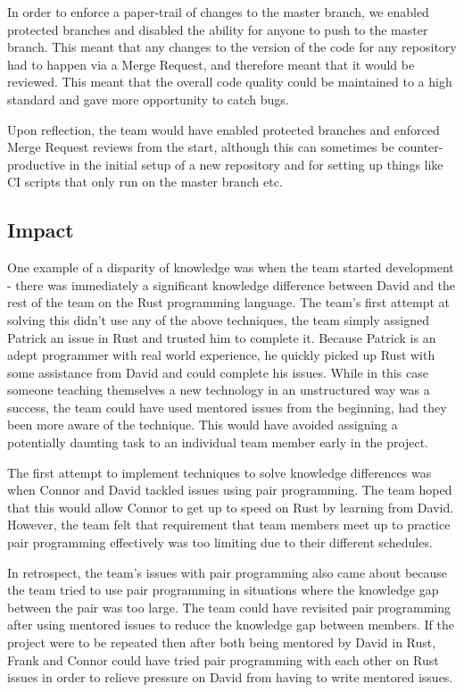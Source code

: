 \documentclass{l3proj}
\begin{document}
In order to enforce a paper-trail of changes to the master branch, we enabled protected branches and disabled the ability for anyone to push to the master branch. This meant that any changes to the  version of the code for any repository had to happen via a Merge Request, and therefore meant that it would be reviewed. This meant that the overall code quality could be maintained to a high standard and gave more opportunity to catch bugs.

Upon reflection, the team would have enabled protected branches and enforced Merge Request reviews from the start, although this can sometimes be counter-productive in the initial setup of a new repository and for setting up things like CI scripts that only run on the master branch etc.

\subsection{Impact}
One example of a disparity of knowledge was when the team started development - there was immediately a significant knowledge difference between David and the rest of the team on the Rust programming language. The team's first attempt at solving this didn't use any of the above techniques, the team simply assigned Patrick an issue in Rust and trusted him to complete it. Because Patrick is an adept programmer with real world experience, he quickly picked up Rust with some assistance from David and could complete his issues. While in this case someone teaching themselves a new technology in an unstructured way was a success, the team could have used mentored issues from the beginning, had they been more aware of the technique. This would have avoided assigning a potentially daunting task to an individual team member early in the project.

The first attempt to implement techniques to solve knowledge differences was when Connor and David tackled issues using pair programming. The team hoped that this would allow Connor to get up to speed on Rust by learning from David. However, the team felt that requirement that team members meet up to practice pair programming effectively was too limiting due to their different schedules.

In retrospect, the team's issues with pair programming also came about because the team tried to use pair programming in situations where the knowledge gap between the pair was too large. The team could have revisited pair programming after using mentored issues to reduce the knowledge gap between members. If the project were to be repeated then after both being mentored by David in Rust, Frank and Connor could have tried pair programming with each other on Rust issues in order to relieve pressure on David from having to write mentored issues.
\end{document}
